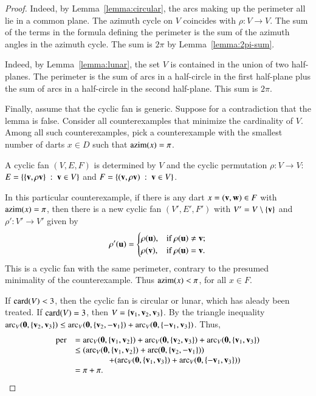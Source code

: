 \begin{proof} 
Indeed, by Lemma~\ref{lemma:circular}, 
the arcs making up the perimeter all lie in a common plane.   
The azimuth cycle on $V$ coincides with $\rho:V\to V$.
The sum of the terms in the formula defining the perimeter is the sum of the azimuth angles in the azimuth cycle.  The sum is $2\pi$ by Lemma~\ref{lemma:2pi-sum}.


Indeed, by Lemma~\ref{lemma:lunar}, the set $V$ is contained in the union of two half-planes.
The perimeter is the sum of arcs in a half-circle in the first half-plane plus
the sum of arcs in a half-circle in the second half-plane. This sum is $2\pi$.

Finally, assume that the cyclic fan is generic.
Suppose for a contradiction that the lemma is false.  Consider all counterexamples
that minimize the cardinality of $V$.  Among all such counterexamples, pick a counterexample with the smallest number of darts $x\in D$ such that ${\operatorname{azim}}(x) = \pi$.

A cyclic fan $(V,E,F)$ is determined by $V$ and the cyclic permutation $\rho:V\to V$:  $E=\{\{{\mathbf v},\rho {\mathbf v}\}\ :\  {\mathbf v}\in V\}$ and $F = \{({\mathbf v},\rho {\mathbf v})\ :\  {\mathbf v}\in V\}$.

In this particular counterexample, if there is any dart $x=({\mathbf v},{\mathbf w})\in F$ with ${\operatorname{azim}}(x)=\pi$, then there is a new cyclic fan $(V',E',F')$ with $V' = V\setminus\{{\mathbf v}\}$ and $\rho':V'\to V'$ given by 
$$
\rho'({\mathbf u}) = \begin{cases}
\rho({\mathbf u}), & \text{if } \rho({\mathbf u})\ne {\mathbf v};\\
\rho({\mathbf v}), & \text{if }\rho({\mathbf u}) = {\mathbf v}.\\
\end{cases}
$$
This is a cyclic fan with the same perimeter, contrary to the presumed minimality of the counterexample.  Thus ${\operatorname{azim}}(x) <\pi$, for all $x\in F$.

If ${\operatorname{card}}(V) <3$, then the cyclic fan is circular or lunar, which has aleady been treated.  If ${\operatorname{card}}(V)=3$, then $V=\{{\mathbf v}_1,{\mathbf v}_2,{\mathbf v}_3\}$.  By the triangle inequality $\operatorname{arc}_V({\mathbf 0},\{{\mathbf v}_2,{\mathbf v}_3\}) \le \operatorname{arc}_V({\mathbf 0},\{{\mathbf v}_2,-{\mathbf v}_1\})+\operatorname{arc}_V({\mathbf 0},\{-{\mathbf v}_1,{\mathbf v}_3\})$.  Thus,
$$
\begin{array}{rll}
{\operatorname{per}} &=\operatorname{arc}_V({\mathbf 0},\{{\mathbf v}_1,{\mathbf v}_2\}) + \operatorname{arc}_V({\mathbf 0},\{{\mathbf v}_2,{\mathbf v}_3\}) + \operatorname{arc}_V({\mathbf 0},\{{\mathbf v}_1,{\mathbf v}_3\})\\
&\le(\operatorname{arc}_V({\mathbf 0},\{{\mathbf v}_1,{\mathbf v}_2\})+\operatorname{arc}({\mathbf 0},\{{\mathbf v}_2,-{\mathbf v}_1\}))
   \\&\qquad\qquad+(\operatorname{arc}_V({\mathbf 0},\{{\mathbf v}_1,{\mathbf v}_3\})+\operatorname{arc}_V({\mathbf 0},\{-{\mathbf v}_1,{\mathbf v}_3\})) \\
   &= \pi+\pi.
\end{array}
$$


\end{proof}
